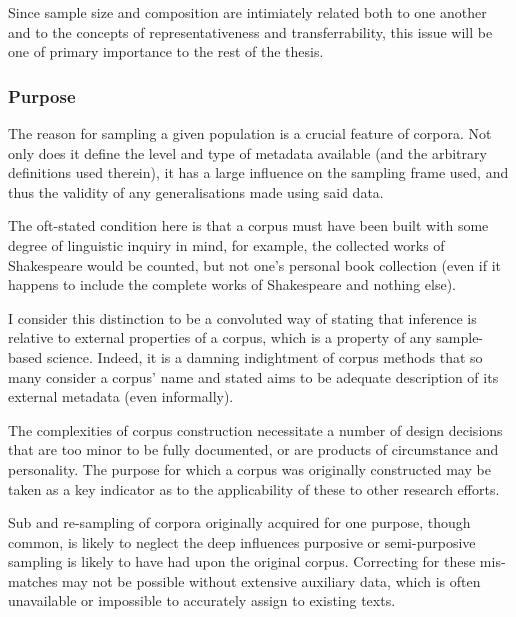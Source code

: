Since sample size and composition are intimiately related both to one another and to the concepts of representativeness and transferrability, this issue will be one of primary importance to the rest of the thesis.






\subsubsection{Purpose}
The reason for sampling a given population is a crucial feature of corpora.  Not only does it define the level and type of metadata available (and the arbitrary definitions used therein), it has a large influence on the sampling frame used, and thus the validity of any generalisations made using said data.

The oft-stated condition here is that a corpus must have been built with some degree of linguistic inquiry in mind, for example, the collected works of Shakespeare would be counted, but not one's personal book collection (even if it happens to include the complete works of Shakespeare and nothing else). %

I consider this distinction to be a convoluted way of stating that inference is relative to external properties of a corpus, which is a property of any sample-based science.  Indeed, it is a damning indightment of corpus methods that so many consider a corpus' name and stated aims to be adequate description of its external metadata (even informally).  

The complexities of corpus construction necessitate a number of design decisions that are too minor to be fully documented, or are products of circumstance and personality.  The purpose for which a corpus was originally constructed may be taken as a key indicator as to the applicability of these to other research efforts.

Sub and re-sampling of corpora originally acquired for one purpose, though common, is likely to neglect the deep influences purposive or semi-purposive sampling is likely to have had upon the original corpus.  Correcting for these mis-matches may not be possible without extensive auxiliary data, which is often unavailable or impossible to accurately assign to existing texts.




